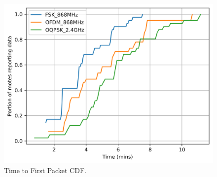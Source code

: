 \documentclass[journal]{IEEEtran}
\begin{document}
\begin{figure}
	\centering
	\includegraphics[width=0.90\columnwidth]{time_firstpacket_cdf}
	\caption{Time to First Packet CDF.}
    \label{fig:time_firstpacket_cdf}
\end{figure}

\end{document}

